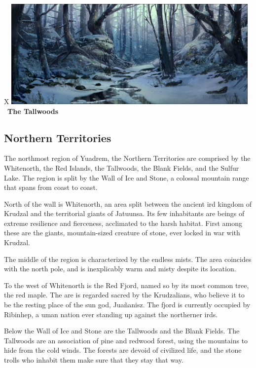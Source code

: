 
\begin{table}[b]%
    \begin{DndTable}[width=\linewidth]{X}
        \centering
        \includegraphics[width=0.95\textwidth]{01yuadrem/img/11tallwoods.png} \
        \centering \large{\textbf{The Tallwoods}}
    \end{DndTable}
\end{table}

\subsection*{Northern Territories} \label{ssec::northernterritories}
The northmost region of Yuadrem, the Northern Territories are comprised by the Whitenorth, the Red Islands, the Tallwoods, the Blank Fields, and the Sulfur Lake.
The region is split by the Wall of Ice and Stone, a colossal mountain range that spans from coast to coast.

North of the wall is Whitenorth, an area split between the ancient ird kingdom of Krudzal and the territorial giants of Jatuunsa.
Its few inhabitants are beings of extreme resilience and fierceness, acclimated to the harsh habitat.
First among these are the giants, mountain-sized creature of stone, ever locked in war with Krudzal.

The middle of the region is characterized by the endless mists.
The area coincides with the north pole, and is inexplicably warm and misty despite its location.

To the west of Whitenorth is the Red Fjord, named so by its most common tree, the red maple.
The are is regarded sacred by the Krudzalians, who believe it to be the resting place of the sun god, Jua\~nanisz.
The fjord is currently occupied by Ribinhep, a uman nation ever standing up against the northerner irds.

Below the Wall of Ice and Stone are the Tallwoods and the Blank Fields.
The Tallwoods are an association of pine and redwood forest, using the mountains to hide from the cold winds.
The forests are devoid of civilized life, and the stone trolls who inhabit them make sure that they stay that way.


